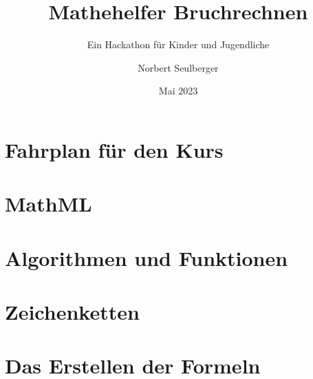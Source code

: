 \documentclass[12p,numbers=noendperiod,DIV=15]{scrreprt}
\begin{document}
	
\title{Mathehelfer Bruchrechnen}
\subtitle{Ein Hackathon für Kinder und Jugendliche}
\author{Norbert Seulberger}
\date{Mai 2023}

\maketitle

\tableofcontents

\chapter{Fahrplan für den Kurs}



\chapter{MathML}




\chapter{Algorithmen und Funktionen}








\chapter{Zeichenketten}



\chapter{Das Erstellen der Formeln}





%
%
%
%
%
%
%

%
%
%
%
\end{document}
